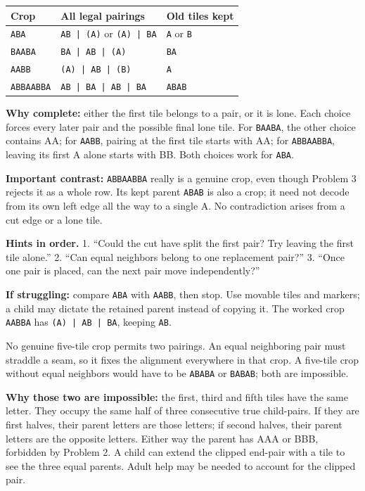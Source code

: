 \documentclass[11pt,letterpaper]{article}
\newcommand{\problem}[2]{\par\vspace{5pt}{\bfseries Problem #1\quad #2}\par\nopagebreak}
\newcommand{\word}[1]{\texttt{#1}}
\newcommand{\hint}[1]{\textbf{Hints in order.} #1}
\begin{document}
\renewcommand{\arraystretch}{1.22}
\begin{tabularx}{\linewidth}{@{}p{25mm}X p{35mm}@{}}
\textbf{Crop} & \textbf{All legal pairings} & \textbf{Old tiles kept} \\\hline
\word{ABA} & \word{AB | (A)} \quad or \quad \word{(A) | BA} & \word{A} \quad or \quad \word{B} \\
\word{BAABA} & \word{BA | AB | (A)} & \word{BA} \\
\word{AABB} & \word{(A) | AB | (B)} & \word{A} \\
\word{ABBAABBA} & \word{AB | BA | AB | BA} & \word{ABAB} \\\hline
\end{tabularx}

\textbf{Why complete:} either the first tile belongs to a pair, or it is lone. Each choice forces every later pair and the possible final lone tile. For \word{BAABA}, the other choice contains AA; for \word{AABB}, pairing at the first tile starts with AA; for \word{ABBAABBA}, leaving its first A alone starts with BB. Both choices work for \word{ABA}.

\textbf{Important contrast:} \word{ABBAABBA} really is a genuine crop, even though Problem 3 rejects it as a whole row. Its kept parent \word{ABAB} is also a crop; it need not decode from its own left edge all the way to a single A. No contradiction arises from a cut edge or a lone tile.

\hint{1. ``Could the cut have split the first pair? Try leaving the first tile alone.'' 2. ``Can equal neighbors belong to one replacement pair?'' 3. ``Once one pair is placed, can the next pair move independently?''}

\textbf{If struggling:} compare \word{ABA} with \word{AABB}, then stop. Use movable tiles and markers; a child may dictate the retained parent instead of copying it. The worked crop \word{AABBA} has \word{(A) | AB | BA}, keeping \word{AB}.

\problem{5}{Further, student page 3}
No genuine five-tile crop permits two pairings. An equal neighboring pair must straddle a seam, so it fixes the alignment everywhere in that crop. A five-tile crop without equal neighbors would have to be \word{ABABA} or \word{BABAB}; both are impossible.

\textbf{Why those two are impossible:} the first, third and fifth tiles have the same letter. They occupy the same half of three consecutive true child-pairs. If they are first halves, their parent letters are those letters; if second halves, their parent letters are the opposite letters. Either way the parent has AAA or BBB, forbidden by Problem 2. A child can extend the clipped end-pair with a tile to see the three equal parents. Adult help may be needed to account for the clipped pair.
\end{document}
